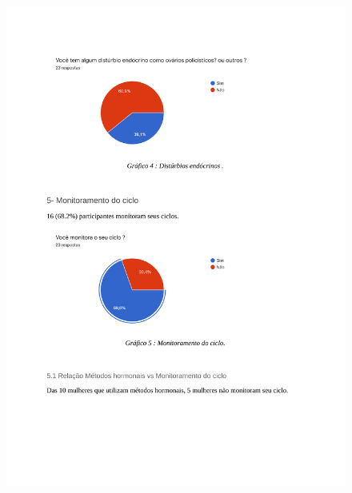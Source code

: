 \begin{apendicesenv}
        \begin{figure}[ht]
            \centering
            \includegraphics[keepaspectratio=true,scale=0.7]{figuras/Tab4.pdf}
        \end{figure}
        

\end{apendicesenv}
